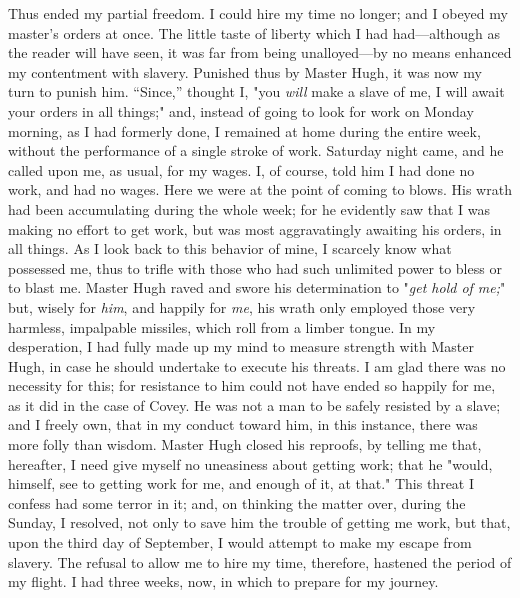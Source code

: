 Thus ended my partial freedom. I could hire my time no longer; and I
obeyed my master's orders at once. The little taste of liberty which I
had had---although as the reader will have seen, it was far from being
unalloyed---by no means enhanced my {}contentment with slavery. Punished
thus by Master Hugh, it was now my turn to punish him. ``Since,''
thought I, "you \emph{will} make a slave of me, I will await your orders
in all things;" and, instead of going to look for work on Monday
morning, as I had formerly done, I remained at home during the entire
week, without the performance of a single stroke of work. Saturday night
came, and he called upon me, as usual, for my wages. I, of course, told
him I had done no work, and had no wages. Here we were at the point of
coming to blows. His wrath had been accumulating during the whole week;
for he evidently saw that I was making no effort to get work, but was
most aggravatingly awaiting his orders, in all things. As I look back to
this behavior of mine, I scarcely know what possessed me, thus to trifle
with those who had such unlimited power to bless or to blast me. Master
Hugh raved and swore his determination to "\emph{get hold of me;}" but,
wisely for \emph{him}, and happily for \emph{me}, his wrath only
employed those very harmless, impalpable missiles, which roll from a
limber tongue. In my desperation, I had fully made up my mind to measure
strength with Master Hugh, in case he should undertake to execute his
threats. I am glad there was no necessity for this; for resistance to
him could not have ended so happily for me, as it did in the case of
Covey. He was not a man to be safely resisted by a slave; and I freely
own, that in my conduct toward him, in this instance, there was more
folly than wisdom. Master Hugh closed his reproofs, by telling me that,
hereafter, I need give myself no uneasiness about getting work; that he
"would, himself, see to {}getting work for me, and enough of it, at
that." This threat I confess had some terror in it; and, on thinking the
matter over, during the Sunday, I resolved, not only to save him the
trouble of getting me work, but that, upon the third day of September, I
would attempt to make my escape from slavery. The refusal to allow me to
hire my time, therefore, hastened the period of my flight. I had three
weeks, now, in which to prepare for my journey.

